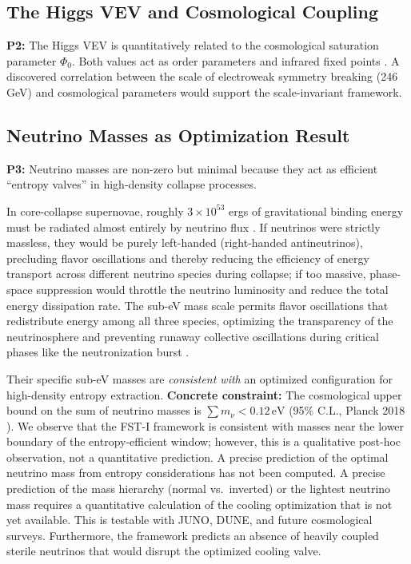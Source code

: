 \documentclass[12pt,a4paper]{article}
\theoremstyle{remark}
\begin{document}
\subsection{The Higgs VEV and Cosmological Coupling}

\textbf{P2:} The Higgs VEV is quantitatively related to the cosmological saturation parameter $\Phi_0$. Both values act as order parameters and infrared fixed points \citep{HiggsVEV2024}. A discovered correlation between the scale of electroweak symmetry breaking (246 GeV) and cosmological parameters would support the scale-invariant framework.

\subsection{Neutrino Masses as Optimization Result}

\textbf{P3:} Neutrino masses are non-zero but minimal because they act as efficient ``entropy valves'' in high-density collapse processes.

In core-collapse supernovae, roughly $3 \times 10^{53}$ ergs of gravitational binding energy must be radiated almost entirely by neutrino flux \citep{SupernovaNeutrinos,SupernovaSimulations}. If neutrinos were strictly massless, they would be purely left-handed (right-handed antineutrinos), precluding flavor oscillations and thereby reducing the efficiency of energy transport across different neutrino species during collapse; if too massive, phase-space suppression would throttle the neutrino luminosity and reduce the total energy dissipation rate. The sub-eV mass scale permits flavor oscillations that redistribute energy among all three species, optimizing the transparency of the neutrinosphere and preventing runaway collective oscillations during critical phases like the neutronization burst \citep{NeutrinoOscillations}.

Their specific sub-eV masses are \emph{consistent with} an optimized configuration for high-density entropy extraction. \textbf{Concrete constraint:} The cosmological upper bound on the sum of neutrino masses is $\sum m_\nu < 0.12\,\text{eV}$ (95\% C.L., Planck 2018 \citep{Planck2018}). We observe that the FST-I framework is consistent with masses near the lower boundary of the entropy-efficient window; however, this is a qualitative post-hoc observation, not a quantitative prediction. A precise prediction of the optimal neutrino mass from entropy considerations has not been computed. A precise prediction of the mass hierarchy (normal vs.\ inverted) or the lightest neutrino mass requires a quantitative calculation of the cooling optimization that is not yet available. This is testable with JUNO, DUNE, and future cosmological surveys. Furthermore, the framework predicts an absence of heavily coupled sterile neutrinos that would disrupt the optimized cooling valve.
\end{document}
